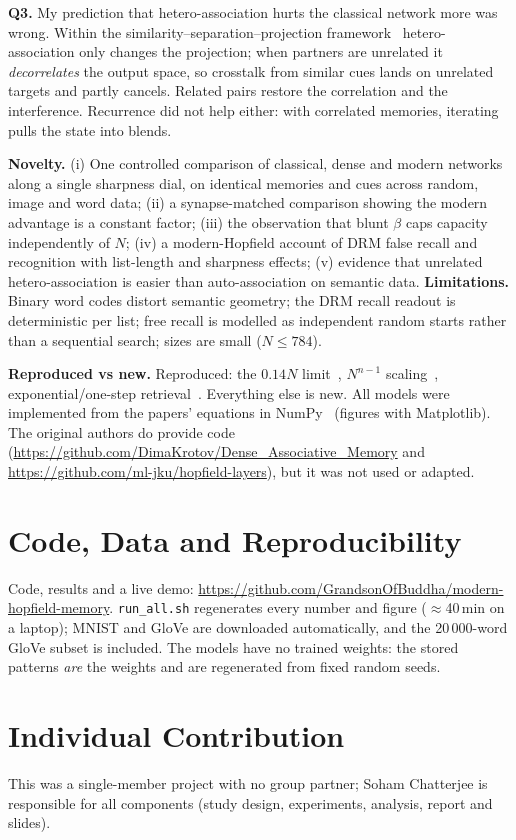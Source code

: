 \documentclass[conference]{IEEEtran}
\begin{document}
\textbf{Q3.} My prediction that hetero-association hurts the classical network more was wrong. Within the similarity--separation--projection framework~\cite{millidge22} hetero-association only changes the projection; when partners are unrelated it \emph{decorrelates} the output space, so crosstalk from similar cues lands on unrelated targets and partly cancels. Related pairs restore the correlation and the interference. Recurrence did not help either: with correlated memories, iterating pulls the state into blends.

\textbf{Novelty.} (i) One controlled comparison of classical, dense and modern networks along a single sharpness dial, on identical memories and cues across random, image and word data; (ii) a synapse-matched comparison showing the modern advantage is a constant factor; (iii) the observation that blunt $\beta$ caps capacity independently of $N$; (iv) a modern-Hopfield account of DRM false recall and recognition with list-length and sharpness effects; (v) evidence that unrelated hetero-association is easier than auto-association on semantic data. \textbf{Limitations.} Binary word codes distort semantic geometry; the DRM recall readout is deterministic per list; free recall is modelled as independent random starts rather than a sequential search; sizes are small ($N\le784$).

\textbf{Reproduced vs new.} Reproduced: the $0.14N$ limit~\cite{ags85}, $N^{n-1}$ scaling~\cite{krotov16}, exponential/one-step retrieval~\cite{ramsauer21}. Everything else is new. All models were implemented from the papers' equations in NumPy~\cite{numpy} (figures with Matplotlib). The original authors do provide code (\url{https://github.com/DimaKrotov/Dense_Associative_Memory} and \url{https://github.com/ml-jku/hopfield-layers}), but it was not used or adapted.

\section*{Code, Data and Reproducibility}
Code, results and a live demo: \url{https://github.com/GrandsonOfBuddha/modern-hopfield-memory}. \texttt{run\_all.sh} regenerates every number and figure ($\approx$40\,min on a laptop); MNIST and GloVe are downloaded automatically, and the 20\,000-word GloVe subset is included. The models have no trained weights: the stored patterns \emph{are} the weights and are regenerated from fixed random seeds.

\section*{Individual Contribution}
This was a single-member project with no group partner; Soham Chatterjee is responsible for all components (study design, experiments, analysis, report and slides).
\end{document}
